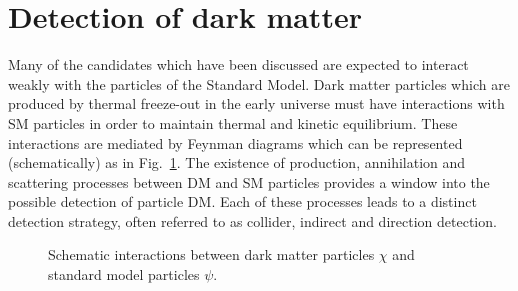 \section{Detection of dark matter}

Many of the candidates which have been discussed are expected to interact weakly with the particles of the Standard Model. Dark matter particles which are produced by thermal freeze-out in the early universe must have interactions with SM  particles in order to maintain thermal and kinetic equilibrium. These interactions are mediated by Feynman diagrams which can be represented (schematically) as in Fig.~\ref{intro:fig:diagrams}. The existence of production, annihilation and scattering processes between DM and SM particles provides a window into the possible detection of particle DM. Each of these processes leads to a distinct detection strategy, often referred to as collider, indirect and direction detection.

\begin{figure}[t]

	\centering
   \caption[Schematic dark matter interactions]{Schematic interactions between dark matter particles $\chi$ and standard model particles $\psi$.}
\label{intro:fig:diagrams}
\end{figure}

